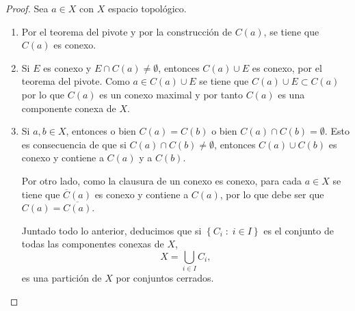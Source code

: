 \begin{proof}
Sea $\displaystyle a \in X $ con $\displaystyle X $ espacio topológico.
\begin{enumerate}
\item Por el teorema del pivote y por la construcción de $\displaystyle C\left(a\right) $, se tiene que $\displaystyle C\left(a\right) $ es conexo. 
\item Si $\displaystyle E $ es conexo y $\displaystyle E \cap C\left(a\right)\neq \emptyset $, entonces $\displaystyle C\left(a\right)\cup E $ es conexo, por el teorema del pivote. Como $\displaystyle a \in C\left(a\right)\cup E $ se tiene que $\displaystyle C\left(a\right)\cup E \subset C\left(a\right) $ por lo que $\displaystyle C\left(a\right) $ es un conexo maximal y por tanto $\displaystyle C\left(a\right) $ es una componente conexa de $\displaystyle X $.
\item Si $\displaystyle a,b \in X $, entonces o bien $\displaystyle C\left(a\right)=C\left(b\right) $ o bien $\displaystyle C\left(a\right)\cap C\left(b\right)= \emptyset $. Esto es consecuencia de que si $\displaystyle C\left(a\right)\cap C\left(b\right)\neq \emptyset $, entonces $\displaystyle C\left(a\right)\cup C\left(b\right) $ es conexo y contiene a $\displaystyle C\left(a\right) $ y a $\displaystyle C\left(b\right) $. 

Por otro lado, como la clausura de un conexo es conexo, para cada $\displaystyle a \in X $ se tiene que $\displaystyle \overline{C}\left(a\right) $ es conexo y contiene a $\displaystyle C\left(a\right) $, por lo que debe ser que $\displaystyle C\left(a\right)=\overline{C\left(a\right)} $. 

Juntado todo lo anterior, deducimos que si $\displaystyle \left\{ C_{i} \; :\; i \in I\right\}  $ es el conjunto de todas las componentes conexas de $\displaystyle X $, 
\[X = \bigcup_{i \in I}C_{i} ,\]
es una partición de $\displaystyle X $ por conjuntos cerrados.
\end{enumerate}
\end{proof}

